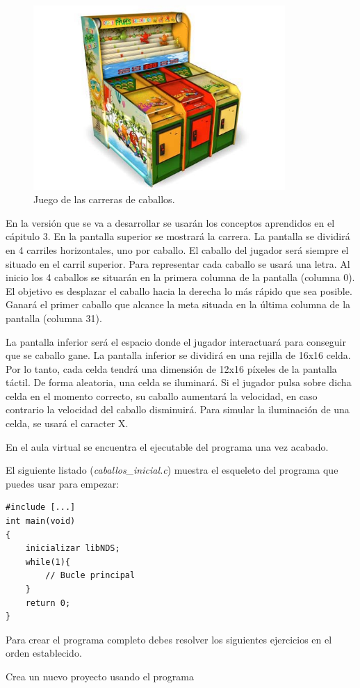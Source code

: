 \begin{figure}[t]
	\centering
	\includegraphics[height=7cm]{Figuras/C4/c4_caballos.jpg}
	\caption{Juego de las carreras de caballos.}
	\label{fig_c4_caballos}
\end{figure}

En la versión que se va a desarrollar se usarán los conceptos aprendidos en el cápitulo 3. En la pantalla superior se mostrará la carrera. La pantalla se dividirá en 4 carriles horizontales, uno por caballo. El caballo del jugador será siempre el situado en el carril superior. Para representar cada caballo se usará una letra. Al inicio los 4 caballos se situarán en la primera columna de la pantalla (columna 0). El objetivo es desplazar el caballo hacia la derecha lo más rápido que sea posible. Ganará el primer caballo que alcance la meta situada en la última columna de la pantalla (columna 31).

La pantalla inferior será el espacio donde el jugador interactuará para conseguir que se caballo gane. La pantalla inferior se dividirá en una rejilla de 16x16 celda. Por lo tanto, cada celda tendrá una dimensión de 12x16 píxeles de la pantalla táctil. De forma aleatoria, una celda se iluminará. Si el jugador pulsa sobre dicha celda en el momento correcto, su caballo aumentará la velocidad, en caso contrario la velocidad del caballo disminuirá. Para simular la iluminación de una celda, se usará el caracter X.

En el aula virtual se encuentra el ejecutable del programa una vez acabado.

El siguiente listado (\textit{caballos\_inicial.c}) muestra el esqueleto del programa que puedes usar para empezar:
\begin{lstlisting}
#include [...] 
int main(void)
{
	inicializar libNDS; 
	while(1){
		// Bucle principal 
	}
	return 0;
}
\end{lstlisting}

Para crear el programa completo debes resolver los siguientes ejercicios en el orden establecido.

\begin{exercise}
	Crea un nuevo proyecto usando el programa 
\end{exercise}

